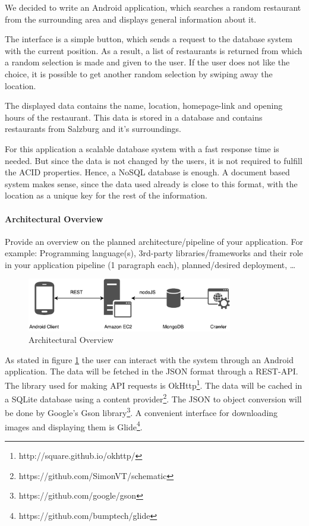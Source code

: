 We decided to write an Android application, which searches a random restaurant from the surrounding area and displays general information about it.

The interface is a simple button, which sends a request to the database system with the current position. As a result, a list of restaurants is returned from which a random selection is made and given to the user. If the user does not like the choice, it is possible to get another random selection by swiping away the location.

The displayed data contains the name, location, homepage-link and opening hours of the restaurant. This data is stored in a database and contains restaurants from Salzburg and it's surroundings. 

For this application a scalable database system with a fast response time is needed. But since the data is not changed by the users, it is not required to fulfill the ACID properties. Hence, a NoSQL database is enough. A document based system makes sense, since the data used already is close to this format, with the location as a unique key for the rest of the information.



\paragraph{Architectural Overview}

Provide an overview on the planned architecture/pipeline of your application.
For example: Programming language(s), 3rd-party libraries/frameworks and their
role in your application pipeline (1 paragraph each), planned/desired
deployment, \ldots

\begin{figure}[H]
	\centering
	\includegraphics[width=0.8\textwidth]{img/Arch}
	\caption{Architectural Overview}
	\label{fig:Arch}
\end{figure}

As stated in figure \ref{fig:Arch} the user can interact with the system through an Android application. The data will be fetched in the JSON format through a REST-API. The library used for making API requests is OkHttp\footnote{http://square.github.io/okhttp/}. The data will be cached in a SQLite database using a content provider\footnote{https://github.com/SimonVT/schematic}. The JSON to object conversion will be done by Google's Gson library\footnote{https://github.com/google/gson}. A convenient interface for downloading images and displaying them is Glide\footnote{https://github.com/bumptech/glide}. 

